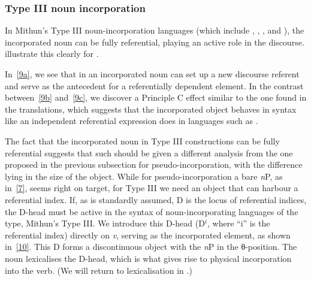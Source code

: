 \documentclass[output=paper]{langsci/langscibook}
\begin{document}
\begin{refcontext}
\subsubsection{Type III noun incorporation}
In Mithun’s Type III noun-incorporation languages (which include ,
, , and ), the incorporated noun can be fully referential,
playing an active role in the discourse.  \citet[145--146]{bakeretal05}
illustrate this clearly for .

\ea \label{9}
    \z
\z
In~\eqref{9a}, we see that in  an incorporated noun can set up a new
discourse referent and serve as the antecedent for a referentially dependent
element. In the contrast between~\eqref{9b} and~\eqref{9c}, we discover a Principle
C effect similar to the one found in the  translations, which suggests
that the incorporated object behaves in syntax like an independent referential
expression does in languages such as .

The fact that the incorporated noun in Type III constructions can be fully
referential suggests that such  should be given a different
analysis from the one proposed in the previous subsection for
pseudo-incorporation, with the difference lying in the size of the object.
While for pseudo-incorporation a bare \emph{n}P, as in~\eqref{7}, seems right on
target, for Type III  we need an object that can harbour a
referential index. If, as is standardly assumed, D is the locus of referential
indices, the D-head must be active in the syntax of noun-incorporating
languages of the  type, Mithun’s Type III. We introduce this D-head
(D$^i$, where \enquote{i} is the referential index) directly on \emph{v}, serving as
the incorporated element, as shown in~\eqref{10}. This D forms a discontinuous
object with the \emph{n}P in the θ{}-position. The noun lexicalises
the  D-head, which is what gives rise to physical incorporation into the verb.
(We will return to lexicalisation in .)


\end{refcontext}
\end{document}

